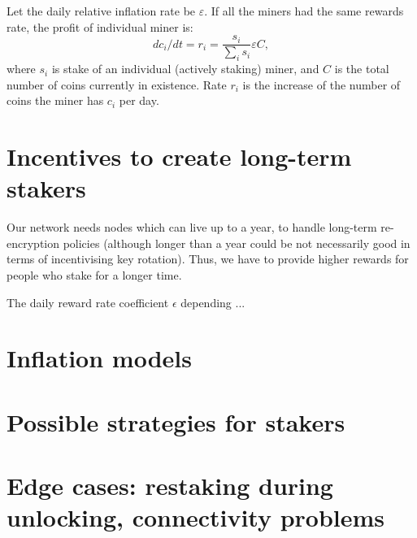 \documentclass[longbibliography,nofootinbib,twocolumn]{revtex4-1}
\begin{document}
Let the daily relative inflation rate be $\varepsilon$.
If all the miners had the same rewards rate, the profit of individual miner is:
\begin{equation}
    dc_i/dt = r_i = \frac{s_i}{\sum_i s_i} \varepsilon C,
\end{equation}
where $s_i$ is stake of an individual (actively staking) miner, and $C$ is the total number of coins currently in existence.
Rate $r_i$ is the increase of the number of coins the miner has $c_i$ per day.

\section{Incentives to create long-term stakers}

Our network needs nodes which can live up to a year, to handle long-term re-encryption policies (although longer than a year could be not necessarily good in
terms of incentivising key rotation).
Thus, we have to provide higher rewards for people who stake for a longer time.

The daily reward rate coefficient $\epsilon$ depending ...

\section{Inflation models}

\section{Possible strategies for stakers}

\section{Edge cases: restaking during unlocking, connectivity problems}
\end{document}
